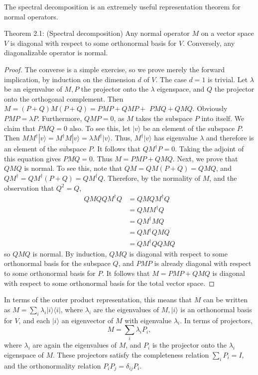 The spectral decomposition is an extremely useful representation theorem for normal operators.

\begin{theorem}
    Theorem 2.1: (Spectral decomposition) Any normal operator $M$ on a vector space $V$ is diagonal with respect to some orthonormal basis for $V$. Conversely, any diagonalizable operator is normal.
\end{theorem}
\begin{proof}
    The converse is a simple exercise, so we prove merely the forward implication, by induction on the dimension $d$ of $V$. The case $d=1$ is trivial. Let $\lambda$ be an eigenvalue of $M, P$ the projector onto the $\lambda$ eigenspace, and $Q$ the projector onto the orthogonal complement. Then $M=(P+Q) M(P+Q)=P M P+Q M P+$ $P M Q+Q M Q$. Obviously $P M P=\lambda P$. Furthermore, $Q M P=0$, as $M$ takes the subspace $P$ into itself. We claim that $P M Q=0$ also. To see this, let $|v\rangle$ be an element of the subspace $P$. Then $M M^{\dagger}|v\rangle=M^{\dagger} M|v\rangle=\lambda M^{\dagger}|v\rangle$. Thus, $M^{\dagger}|v\rangle$ has eigenvalue $\lambda$ and therefore is an element of the subspace $P$. It follows that $Q M^{\dagger} P=0$. Taking the adjoint of this equation gives $P M Q=0$. Thus $M=P M P+Q M Q$. Next, we prove that $Q M Q$ is normal. To see this, note that $Q M=Q M(P+Q)=Q M Q$, and $Q M^{\dagger}=Q M^{\dagger}(P+Q)=Q M^{\dagger} Q$. Therefore, by the normality of $M$, and the observation that $Q^{2}=Q$,
\begin{equation}
\begin{aligned}
Q M Q Q M^{\dagger} Q & =Q M Q M^{\dagger} Q \\
& =Q M M^{\dagger} Q \\
& =Q M^{\dagger} M Q \\
& =Q M^{\dagger} Q M Q \\
& =Q M^{\dagger} Q Q M Q
\end{aligned}
\end{equation}
so $Q M Q$ is normal. By induction, $Q M Q$ is diagonal with respect to some orthonormal basis for the subspace $Q$, and $P M P$ is already diagonal with respect to some orthonormal basis for $P$. It follows that $M=P M P+Q M Q$ is diagonal with respect to some orthonormal basis for the total vector space.
\end{proof}

In terms of the outer product representation, this means that $M$ can be written as $M=\sum_{i} \lambda_{i}|i\rangle\langle i|$, where $\lambda_{i}$ are the eigenvalues of $M,|i\rangle$ is an orthonormal basis for $V$, and each $|i\rangle$ an eigenvector of $M$ with eigenvalue $\lambda_{i}$. In terms of projectors, 
\begin{equation}
    M=\sum_{i} \lambda_{i} P_{i},
\end{equation}
where $\lambda_{i}$ are again the eigenvalues of $M$, and $P_{i}$ is the projector onto the $\lambda_{i}$ eigenspace of $M$. These projectors satisfy the completeness relation $\sum_{i} P_{i}=I$, and the orthonormality relation $P_{i} P_{j}=\delta_{i j} P_{i}$.

